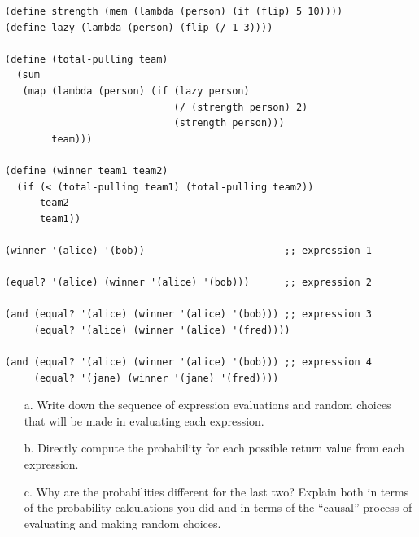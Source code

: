 \begin{lstlisting}
(define strength (mem (lambda (person) (if (flip) 5 10))))
(define lazy (lambda (person) (flip (/ 1 3))))
    
(define (total-pulling team)
  (sum
   (map (lambda (person) (if (lazy person)
                             (/ (strength person) 2)
                             (strength person)))
        team)))
    
(define (winner team1 team2)
  (if (< (total-pulling team1) (total-pulling team2))
      team2
      team1))
    
(winner '(alice) '(bob))                        ;; expression 1
    
(equal? '(alice) (winner '(alice) '(bob)))      ;; expression 2
    
(and (equal? '(alice) (winner '(alice) '(bob))) ;; expression 3
     (equal? '(alice) (winner '(alice) '(fred))))
    
(and (equal? '(alice) (winner '(alice) '(bob))) ;; expression 4
     (equal? '(jane) (winner '(jane) '(fred))))
\end{lstlisting}

\begin{itemize}
    \item[a.] Write down the sequence of expression evaluations and random choices that will be made in evaluating each expression.
    \item[b.] Directly compute the probability for each possible return value from each expression.
    \item[c.] Why are the probabilities different for the last two? Explain both in terms of the probability calculations 
        you did and in terms of the “causal” process of evaluating and making random choices.
\end{itemize}

